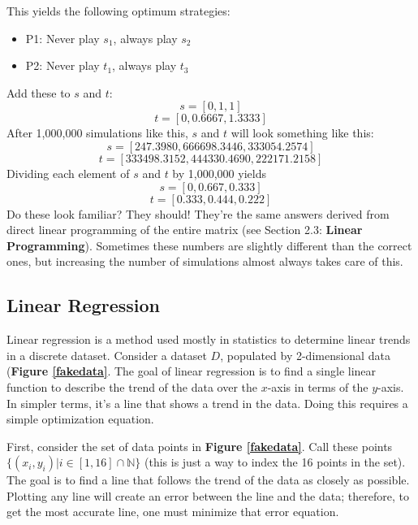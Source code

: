 \documentclass[11pt]{article}
\begin{document}
This yields the following optimum strategies:
\begin{itemize}
\item P1: Never play $s_1$, always play $s_2$
\item P2: Never play $t_1$, always play $t_3$
\end{itemize}
Add these to $s$ and $t$:
\begin{equation*}
s = [0,1,1]
\end{equation*}
\begin{equation*}
t = [0,0.6667,1.3333]
\end{equation*}
After 1,000,000 simulations like this, $s$ and $t$ will look something like
this:
\begin{equation*}
s = [247.3980,666698.3446,333054.2574]
\end{equation*}
\begin{equation*}
t = [333498.3152,444330.4690,222171.2158]
\end{equation*}
Dividing each element of $s$ and $t$ by 1,000,000 yields
\begin{equation*}
s = [0,0.667,0.333]
\end{equation*}
\begin{equation*}
t = [0.333,0.444,0.222]
\end{equation*}
Do these look familiar? They should! They're the same answers derived from
direct linear programming of the entire matrix (see Section 2.3:
\textbf{Linear Programming}). Sometimes these numbers are slightly
different than the correct ones, but increasing the number of simulations
almost always takes care of this.


\subsection{Linear Regression}

Linear regression is a method used mostly in statistics to determine
linear trends in a discrete dataset. Consider a dataset $D$, populated
by 2-dimensional data (\textbf{Figure \ref{fakedata}}. The goal of
linear regression is to find a single linear function to describe the
trend of the data over the $x$-axis in terms of the $y$-axis. In
simpler terms, it's a line that shows a trend in the data. Doing this
requires a simple optimization equation.

First, consider the set of data points in \textbf{Figure
\ref{fakedata}}. Call these points
$\{(x_i,y_i)|i\in [1,16] \cap \mathbb{N} \}$ (this is just a way to index
the 16 points in the set). The goal is to find a line that follows the
trend of the data as closely as possible. Plotting any line will create
an error between the line and the data; therefore, to get the most
accurate line, one must minimize that error equation.
\end{document}
